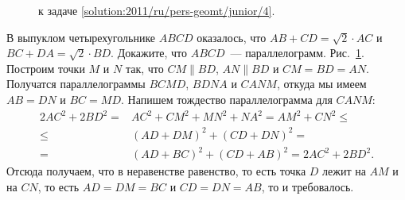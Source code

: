 \ifsolution
\begin{figure}\centering
    \caption{к задаче \ref{solution:2011/ru/pers-geomt/junior/4}.}
    \label{fig:solution:2011/ru/pers-geomt/junior/4}
\end{figure}
\fi %

\problem
В выпуклом четырехугольнике $ABCD$ оказалось, что
$AB + CD = \sqrt{2} \cdot AC$
и
$BC + DA = \sqrt{2} \cdot BD$.
Докажите, что $ABCD$~--- параллелограмм.
\solution
\label{solution:2011/ru/pers-geomt/junior/4}%
Рис.~\ref{fig:solution:2011/ru/pers-geomt/junior/4}.
Построим точки $M$ и $N$ так, что
$CM \parallel BD$, $AN \parallel BD$ и $CM = BD = AN$.
Получатся параллелограммы $BCMD$, $BDNA$ и $CANM$, откуда мы
имеем $AB = DN$ и $BC = MD$.
Напишем тождество параллелограмма для $CANM$:
\begin{align*}
    2 AC^2 + 2 BD^2
={}&
    AC^2 + CM^2 + MN^2 + NA^2
=
    AM^2 + CN^2
\leq\\\leq{}&
    (AD + DM)^2 + (CD + DN)^2
=\\={}&
    (AD + BC)^2 + (CD + AB)^2
=
    2 AC^2 + 2 BD^2
.\end{align*}
Отсюда получаем, что в неравенстве равенство, то есть точка $D$ лежит на
$AM$ и на $CN$, то есть $AD = DM = BC$ и $CD = DN = AB$, то и требовалось.
\endproblem
